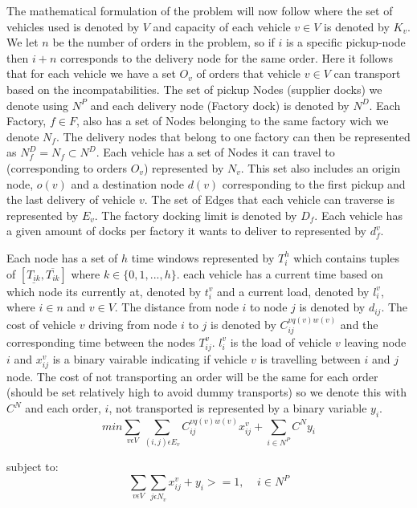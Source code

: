 \documentclass[a4paper,12pt]{article}
\begin{document}
The mathematical formulation of the problem will now follow where the set of vehicles used is denoted by $V$ and capacity of each vehicle $v \in V$ is denoted by $K_v$. We let $n$ be the number of orders in the problem, so if $i$ is a specific pickup-node then $i+n$ corresponds to the delivery node for the same order. Here it follows that for each vehicle we have a set $O_v$ of orders that vehicle $v \in V$ can transport based on the incompatabilities. The set of pickup Nodes (supplier docks) we denote using $N^P$ and each delivery node (Factory dock) is denoted by $N^D$. Each Factory, $f \in F$, also has a set of Nodes belonging to the same factory wich we denote $N_f$. The delivery nodes that belong to one factory can then be represented as $N_f^D = N_f \subset N^D$. Each vehicle has a set of Nodes it can travel to (corresponding to orders $O_v$) represented by $N_v$. This set also includes an origin node, $o(v)$ and a destination node $d(v)$ corresponding to the first pickup and the last delivery of vehicle $v$. The set of Edges that each vehicle can traverse is represented by $E_v$. The factory docking limit is denoted by $D_f$. Each vehicle has a given amount of docks per factory it wants to deliver to represented by $d_{f}^v$. \par 
Each node has a set of $h$ time windows represented by $T_i^h$ which contains tuples of $[ \underline{T_{ik}},  \overline{T_{ik}} ]$ where $k \in \{0,1,...,h\}$. each vehicle has a current time based on which node its currently at, denoted by $t_{i}^v$ and a current load, denoted by $l_{i}^v$, where $i \in n$ and $v \in V$. The distance from node $i$ to node $j$ is denoted by $d_{ij}$. The cost of vehicle $v$ driving from node $i$ to $j$ is denoted by $C_{ij}^{vq(v)w(v)}$ and the corresponding time between the nodes $T_{ij}^v$. $l_{i}^v$ is the load of vehicle $v$ leaving node $i$ and $x_{ij}^v$ is a binary vairable indicating if vehicle $v$ is travelling between $i$ and $j$ node. The cost of not transporting an order will be the same for each order (should be set relatively high to avoid dummy transports) so we denote this with $C^N$ and each order, $i$,  not transported is represented by a binary variable $y_i$. 
\begin{equation}
\label{eq:1}
min\sum_{v\epsilon V} \sum_{(i,j)\epsilon E_v} C_{ij}^{vq(v)w(v)}x_{ij}^v + \sum_{i\in N^P}C^Ny_i
\end{equation}

subject to:
\begin{equation} \label{eq:2}
\sum_{v\epsilon V}\sum_{j\epsilon N_v} x_{ij}^v + y_i >= 1, ~~~~~ i \in N^P
\end{equation}
\end{document}
